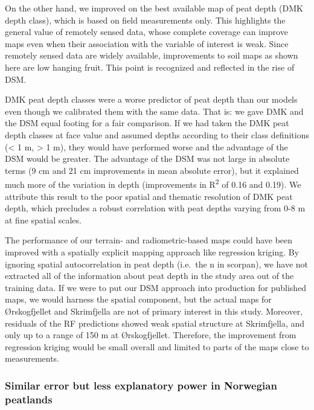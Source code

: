 \documentclass[soil, manuscript]{copernicus}
\begin{document}
On the other hand, we improved on the best available map of peat depth (DMK depth class), which is based on field measurements only.
This highlights the general value of remotely sensed data, whose complete coverage can improve maps even when their association with the variable of interest is weak.
Since remotely sensed data are widely available, improvements to soil maps as shown here are low hanging fruit.
This point is recognized and reflected in the rise of DSM.

DMK peat depth classes were a worse predictor of peat depth than our models even though we calibrated them with the same data.
That is: we gave DMK and the DSM equal footing for a fair comparison.
If we had taken the DMK peat depth classes at face value and assumed depths according to their class definitions (\textless{} 1 m, \textgreater{} 1 m), they would have performed worse and the advantage of the DSM would be greater.
The advantage of the DSM was not large in absolute terms (9 cm and 21 cm improvements in mean absolute error), but it explained much more of the variation in depth (improvements in R\textsuperscript{2} of 0.16 and 0.19).
We attribute this result to the poor spatial and thematic resolution of DMK peat depth, which precludes a robust correlation with peat depths varying from 0-8 m at fine spatial scales.

The performance of our terrain- and radiometric-based maps could have been improved with a spatially explicit mapping approach like regression kriging.
By ignoring spatial autocorrelation in peat depth (i.e.~the n in scorpan), we have not extracted all of the information about peat depth in the study area out of the training data.
If we were to put our DSM approach into production for published maps, we would harness the spatial component, but the actual maps for Ørskogfjellet and Skrimfjella are not of primary interest in this study.
Moreover, residuals of the RF predictions showed weak spatial structure at Skrimfjella, and only up to a range of 150 m at Ørskogfjellet.
Therefore, the improvement from regression kriging would be small overall and limited to parts of the maps close to measurements.

\subsubsection{Similar error but less explanatory power in Norwegian peatlands}
\end{document}
